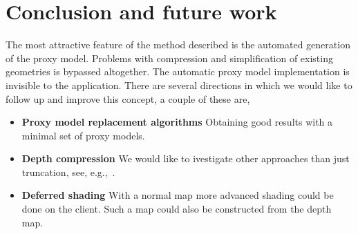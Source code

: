 \documentclass[10pt,conference,compsocconf]{IEEEtran}
\newcommand{\eg}{{e.g.}}
\begin{document}
\section{Conclusion and future work}
\label{sec:conc}

The most attractive feature of the method described is the automated generation
of the proxy model. Problems with compression and simplification of existing
geometries is bypassed altogether. The automatic proxy model implementation is
invisible to the application. There are several directions in which we would
like to follow up and improve this concept, a couple of these are,
\begin{itemize}

\item \textbf{Proxy model replacement algorithms} Obtaining good results with a minimal set of
proxy models.

\item \textbf{Depth compression} We would like to ivestigate other approaches
than just truncation, see, \eg,~\cite{DBLP:journals/tvcg/Lindstrom14}.

\item \textbf{Deferred shading} With a normal map more advanced
shading could be done on the client. Such a map could also be constructed from
the depth map.

\end{itemize}








%








\end{document}
